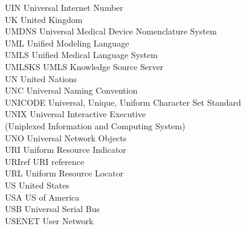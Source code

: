 \begin{tabbing}
    \>UIN \>\>Universal Internet Number\\

    \>UK \>\>United Kingdom\\

    \>UMDNS \>\>Universal Medical Device Nomenclature System\\

    \>UML \>\>Unified Modeling Language\\

    \>UMLS \>\>Unified Medical Language System\\

    \>UMLSKS \>\>UMLS Knowledge Source Server\\


    \>UN \>\>United Nations\\

    \>UNC \>\>Universal Naming Convention\\

    \>UNICODE \>\>Universal, Unique, Uniform Character Set Standard\\

    \>UNIX \>\>Universal Interactive Executive\\
        \>\>\>(Uniplexed Information and Computing System)\\

    \>UNO \>\>Universal Network Objects\\


    \>URI \>\>Uniform Resource Indicator\\

    \>URIref \>\>URI reference\\

    \>URL \>\>Uniform Resource Locator\\


    \>US \>\>United States\\

    \>USA \>\>US of America\\

    \>USB \>\>Universal Serial Bus\\

    \>USENET \>\>User Network\\


\end{tabbing}
